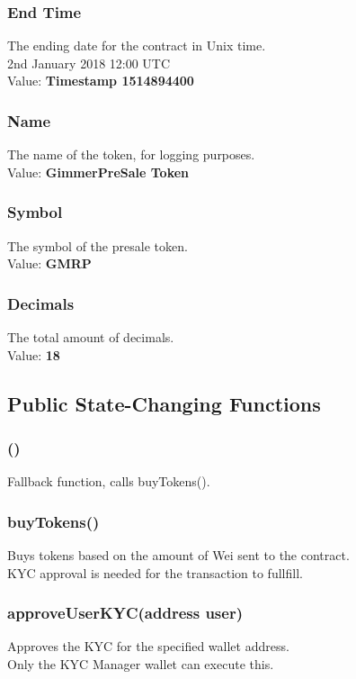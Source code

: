 \documentclass[11pt]{article} %
\begin{document}
\subsubsection{End Time}
The ending date for the contract in Unix time.\\
2nd January 2018 12:00 UTC\\
Value: \textbf{Timestamp 1514894400}

\subsubsection{Name}
The name of the token, for logging purposes.\\
Value: \textbf{GimmerPreSale Token}

\subsubsection{Symbol}
The symbol of the presale token.\\
Value: \textbf{GMRP}

\subsubsection{Decimals}
The total amount of decimals.\\
Value: \textbf{18}

\subsection{Public State-Changing Functions}
\subsubsection{()}
Fallback function, calls buyTokens().

\subsubsection{buyTokens()}
Buys tokens based on the amount of Wei sent to the contract.\\
KYC approval is needed for the transaction to fullfill.

\subsubsection{approveUserKYC(address user)}
Approves the KYC for the specified wallet address.\\
Only the KYC Manager wallet can execute this.
\end{document}
